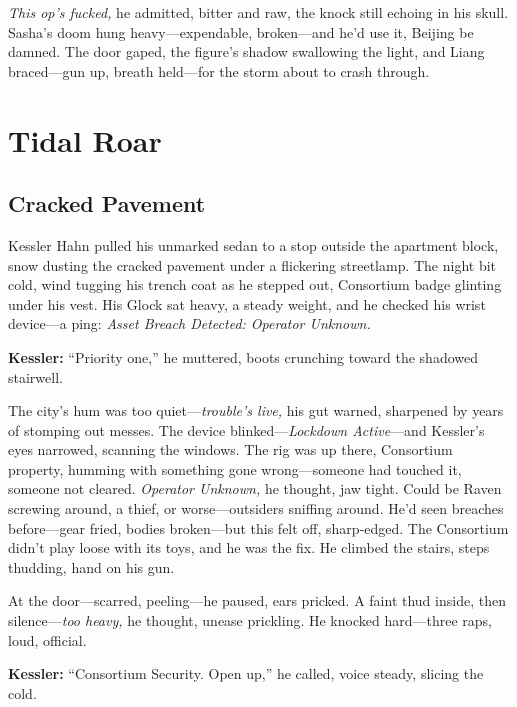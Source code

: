 \documentclass[12pt]{book}
\begin{document}
\emph{This op’s fucked,} he admitted, bitter and raw, the knock still echoing in his skull. Sasha’s doom hung heavy—expendable, broken—and he’d use it, Beijing be damned. The door gaped, the figure’s shadow swallowing the light, and Liang braced—gun up, breath held—for the storm about to crash through.

\vspace{1em}

\chapter{Tidal Roar}

\section{Cracked Pavement}

Kessler Hahn pulled his unmarked sedan to a stop outside the apartment block, snow dusting the cracked pavement under a flickering streetlamp. The night bit cold, wind tugging his trench coat as he stepped out, Consortium badge glinting under his vest. His Glock sat heavy, a steady weight, and he checked his wrist device—a ping: \emph{Asset Breach Detected: Operator Unknown.} 

\vspace{0.5em}
\textbf{Kessler:} “Priority one,” he muttered, boots crunching toward the shadowed stairwell.

The city’s hum was too quiet—\emph{trouble’s live,} his gut warned, sharpened by years of stomping out messes. The device blinked—\emph{Lockdown Active}—and Kessler’s eyes narrowed, scanning the windows. The rig was up there, Consortium property, humming with something gone wrong—someone had touched it, someone not cleared. \emph{Operator Unknown,} he thought, jaw tight. Could be Raven screwing around, a thief, or worse—outsiders sniffing around. He’d seen breaches before—gear fried, bodies broken—but this felt off, sharp-edged. The Consortium didn’t play loose with its toys, and he was the fix. He climbed the stairs, steps thudding, hand on his gun.

At the door—scarred, peeling—he paused, ears pricked. A faint thud inside, then silence—\emph{too heavy,} he thought, unease prickling. He knocked hard—three raps, loud, official. 

\vspace{0.5em}
\textbf{Kessler:} “Consortium Security. Open up,” he called, voice steady, slicing the cold.
\end{document}
